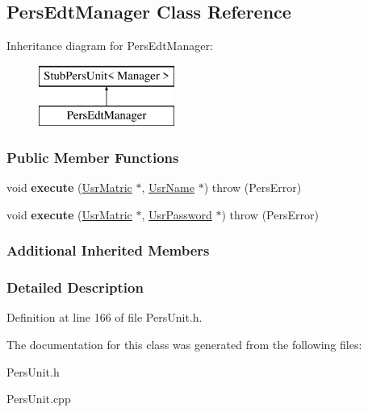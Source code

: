 \hypertarget{classPersEdtManager}{\subsection{Pers\-Edt\-Manager Class Reference}
\label{da/dab/classPersEdtManager}
}
Inheritance diagram for Pers\-Edt\-Manager\-:\begin{figure}[H]
\begin{center}
\leavevmode
\includegraphics[height=2.000000cm]{da/dab/classPersEdtManager}
\end{center}
\end{figure}
\subsubsection*{Public Member Functions}
\begin{DoxyCompactItemize}
\item 
\hypertarget{classPersEdtManager_a537ffad367877114dc9c159fd1eb346e}{void {\bfseries execute} (\hyperlink{classUsrMatric}{Usr\-Matric} $\ast$, \hyperlink{classUsrName}{Usr\-Name} $\ast$)  throw (\-Pers\-Error)}\label{da/dab/classPersEdtManager_a537ffad367877114dc9c159fd1eb346e}

\item 
\hypertarget{classPersEdtManager_a7fa79580f771a5798e819a55ae5fb815}{void {\bfseries execute} (\hyperlink{classUsrMatric}{Usr\-Matric} $\ast$, \hyperlink{classUsrPassword}{Usr\-Password} $\ast$)  throw (\-Pers\-Error)}\label{da/dab/classPersEdtManager_a7fa79580f771a5798e819a55ae5fb815}

\end{DoxyCompactItemize}
\subsubsection*{Additional Inherited Members}


\subsubsection{Detailed Description}


Definition at line 166 of file Pers\-Unit.\-h.



The documentation for this class was generated from the following files\-:\begin{DoxyCompactItemize}
\item 
Pers\-Unit.\-h\item 
Pers\-Unit.\-cpp\end{DoxyCompactItemize}
